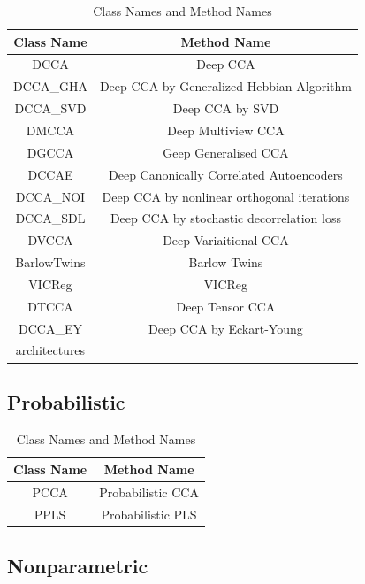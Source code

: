 \begin{table}[ht]
    \centering
    \begin{tabular}{|c|c|}
        \hline
        Class Name & Method Name \\
        \hline
        DCCA & Deep CCA \\
        DCCA\_GHA & Deep CCA by Generalized Hebbian Algorithm \\
        DCCA\_SVD & Deep CCA by SVD \\
        DMCCA & Deep Multiview CCA \\
        DGCCA & Geep Generalised CCA \\
        DCCAE & Deep Canonically Correlated Autoencoders \\
        DCCA\_NOI & Deep CCA by nonlinear orthogonal iterations \\
        DCCA\_SDL & Deep CCA by stochastic decorrelation loss \\
        DVCCA & Deep Variaitional CCA \\
        BarlowTwins & Barlow Twins \\
        VICReg & VICReg \\
        DTCCA & Deep Tensor CCA \\
        DCCA\_EY & Deep CCA by Eckart-Young \\
        architectures & \\
        \hline
    \end{tabular}
    \caption{Class Names and Method Names}\label{tab:class_method_2}
\end{table}

\subsection{Probabilistic}

\begin{table}[ht]
    \centering
    \begin{tabular}{|c|c|}
        \hline
        Class Name & Method Name \\
        \hline
        PCCA & Probabilistic CCA \\
        PPLS & Probabilistic PLS \\
        \hline
    \end{tabular}
    \caption{Class Names and Method Names}\label{tab:class_method_3}
\end{table}

\subsection{Nonparametric}

